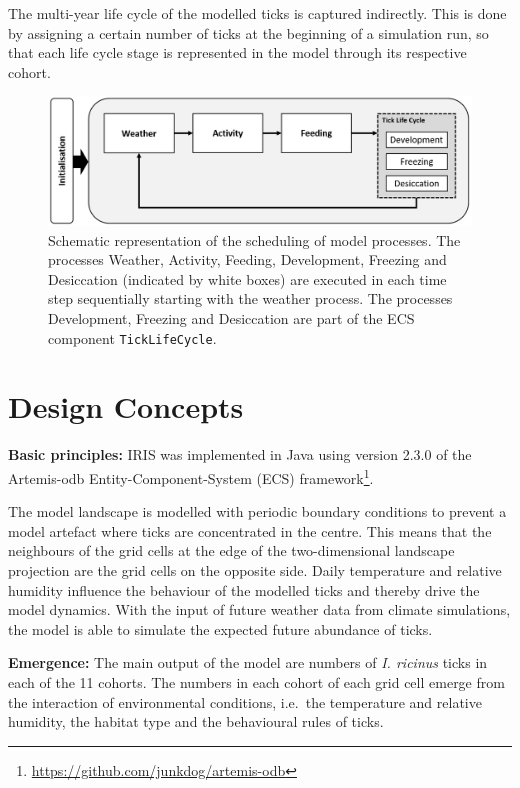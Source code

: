 \documentclass[a4paper, 11pt]{scrartcl}
\newcommand{\inlinecode}[1]{\texttt{\small #1}}
\begin{document}
The multi-year life cycle of the modelled ticks is captured indirectly. This is done by assigning a certain number of ticks at the beginning of a simulation run, so that each life cycle stage is represented in the model through its respective cohort.

\begin{figure}[h!]
\centering
\includegraphics[width=0.8\linewidth]{figures/iris_scheduling.png}
\caption[Schematic representation of the scheduling of model processes.]{Schematic representation of the scheduling of model processes. The processes Weather, Activity, Feeding, Development, Freezing and Desiccation (indicated by white boxes) are executed in each time step sequentially starting with the weather process. The processes Development, Freezing and Desiccation are part of the ECS component \inlinecode{TickLifeCycle}.}
\label{fig:iris_scheduling}
\end{figure}


\newpage
\section{Design Concepts}\label{design_concepts}
\textbf{Basic principles:} IRIS was implemented in Java using version 2.3.0 of the Artemis-odb Entity-Component-System (ECS) framework\footnote{\url{https://github.com/junkdog/artemis-odb}}.

The model landscape is modelled with periodic boundary conditions to prevent a model artefact where ticks are concentrated in the centre. This means that the neighbours of the grid cells at the edge of the two-dimensional landscape projection are the grid cells on the opposite side. Daily temperature and relative humidity influence the behaviour of the modelled ticks and thereby drive the model dynamics. With the input of future weather data from climate simulations, the model is able to simulate the expected future abundance of ticks.

\textbf{Emergence:} The main output of the model are numbers of \emph{I. ricinus} ticks in each of the 11 cohorts. The numbers in each cohort of each grid cell emerge from the interaction of environmental conditions, i.e.\ the temperature and relative humidity, the habitat type and the behavioural rules of ticks.
\end{document}
